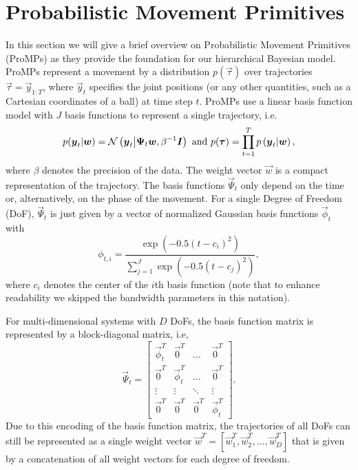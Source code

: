 \section{Probabilistic Movement Primitives}

In this section we will give a brief overview on Probabilistic Movement Primitives (ProMPs) as they provide the foundation for our hierarchical Bayesian model. 
ProMPs represent a movement by a distribution $p(\vec \tau)$ over trajectories $\vec \tau = \vec y_{1:T}$, where $\vec y_t$ specifies the joint positions (or any other quantities, 
such as a Cartesian coordinates of a ball) at time step $t$. ProMPs use a linear basis function model with $J$ basis functions to represent a single trajectory, i.e.
$$ p(\boldsymbol{y}_t|\boldsymbol{w}) = \mathcal{N} \left (\boldsymbol{y}_t \middle |\boldsymbol{\Psi}_t \boldsymbol{w},
\beta^{-1} \boldsymbol{I} \right ) \textrm{ and } p(\boldsymbol{\tau}) = \prod_{t=1}^T
p\left(\boldsymbol{y}_t\middle |\boldsymbol{w}\right),$$
where $\beta$ denotes the precision of the data. 
The weight vector $\vec w$  is a compact representation of the trajectory. 
The basis functions $\vec \Psi_t$ only depend on the time or, alternatively, 
on the phase of the movement. For a single Degree of Freedom (DoF), $\vec \Psi_t$ is just given by a vector of normalized Gaussian basis functions $\vec \phi_t$ with 
$$ \phi_{t,i} = \frac{\exp\left(-0.5 (t - c_i)^2 \right)}{\sum_{j = 1}^J \exp\left(-0.5 (t - c_j)^2\right)},$$
where $c_i$ denotes the center of the $i$th basis function (note that to enhance readability we skipped the bandwidth parameters in this notation).

For multi-dimensional systems with $D$ DoFs, the basis function matrix
is represented by a block-diagonal matrix, i.e, 
$$\vec \Psi_t = \left[\begin{array}{cccc} \vec \phi_t^T & \vec 0^T & \dots & \vec 0^T \\ \vec 0^T & \vec \phi_t^T &  \dots & \vec 0^T \\ \vdots & \vdots & \ddots & \vdots \\ \vec 0^T & \vec 0^T & \vec 0^T & \vec \phi_t^T  \end{array}\right].$$
Due to this encoding of the basis function matrix, the trajectories of all DoFs can still be represented as 
a single weight vector $\vec w^T = [\vec w_1^T, \vec w_2^T, \dots, \vec w_D^T]$ that is given by a concatenation of all 
weight vectors for each degree of freedom.

